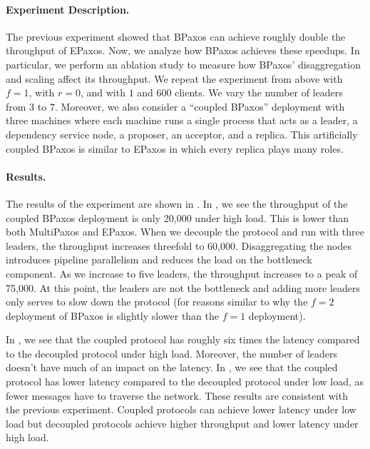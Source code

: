 \paragraph{Experiment Description.}
The previous experiment showed that BPaxos can achieve roughly double the
throughput of EPaxos. Now, we analyze how BPaxos achieves these speedups. In
particular, we perform an ablation study to measure how BPaxos' disaggregation
and scaling affect its throughput. We repeat the experiment from above with
$f=1$, with $r=0$, and with $1$ and $600$ clients. We vary the number of
leaders from $3$ to $7$. Moreover, we also consider a ``coupled BPaxos''
deployment with three machines where each machine runs a single process that
acts as a leader, a dependency service node, a proposer, an acceptor, and a
replica. This artificially coupled BPaxos is similar to EPaxos in which every
replica plays many roles.


\paragraph{Results.}
The results of the experiment are shown in . In
, we see the throughput of the coupled
BPaxos deployment is only 20,000 under high load. This is lower than both
MultiPaxos and EPaxos. When we decouple the protocol and run with three
leaders, the throughput increases threefold to 60,000. Disaggregating the nodes
introduces pipeline parallelism and reduces the load on the bottleneck
component. As we increase to five leaders, the throughput increases to a peak
of 75,000. At this point, the leaders are not the bottleneck and adding more
leaders only serves to slow down the protocol (for reasons similar to why the
$f=2$ deployment of BPaxos is slightly slower than the $f=1$ deployment).

In , we see that the coupled protocol has
roughly six times the latency compared to the decoupled protocol under high
load. Moreover, the number of leaders doesn't have much of an impact on the
latency. In , we see that the coupled
protocol has lower latency compared to the decoupled protocol under low load,
as fewer messages have to traverse the network. These results are consistent
with the previous experiment. Coupled protocols can achieve lower latency under
low load but decoupled protocols achieve higher throughput and lower latency
under high load.

